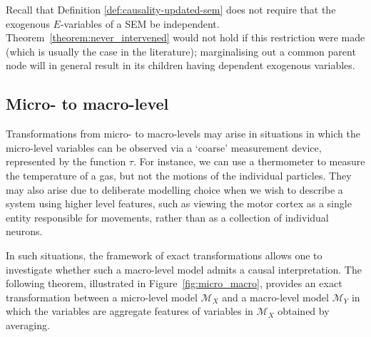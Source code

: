 Recall that Definition \ref{def:causality-updated-sem} does not require that the exogenous $E$-variables of a SEM be independent. 
Theorem~\ref{theorem:never_intervened} would not hold if this restriction were made (which is usually the case in the literature); marginalising out a common parent node will in general result in its children having dependent exogenous variables.

\subsection{Micro- to macro-level}\label{subsection:micromacro}

Transformations from micro- to macro-levels may arise in situations in which the micro-level variables can be observed via a `coarse' measurement device, represented by the function $\tau$.
For instance, we can use a thermometer to measure the temperature of a gas, but not the motions of the individual particles. 
They may also arise due to deliberate modelling choice when we wish to describe a system using higher level features, such as viewing the motor cortex as a single entity responsible for movements, rather than as a collection of individual neurons.

In such situations, the framework of exact transformations allows one to investigate whether such a macro-level model admits a causal interpretation. The following theorem, illustrated in Figure~\ref{fig:micro_macro}, provides an exact transformation between a micro-level model $\mathcal{M}_X$ and a macro-level model $\mathcal{M}_Y$ in which the variables are aggregate features of variables in $\mathcal{M}_X$ obtained by averaging.

\medskip

